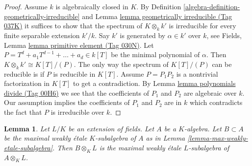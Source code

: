 \documentclass{amsart}
\theoremstyle{plain}
\newtheorem{lemma}[subsection]{Lemma}
\theoremstyle{definition}
\theoremstyle{remark}
\numberwithin{equation}{subsection}
\begin{document}
\begin{proof}
Assume $k$ is algebraically closed in $K$. By
Definition \ref{algebra-definition-geometrically-irreducible}
and Lemma \href{https://stacks.math.columbia.edu/tag/037K}{lemma geometrically irreducible (Tag 037K)} it suffices to show
that the spectrum of $K \otimes_k k'$ is irreducible for every
finite separable extension $k'/k$. Say $k'$ is generated by $\alpha \in k'$
over $k$, see
Fields, Lemma \href{https://stacks.math.columbia.edu/tag/030N}{lemma primitive element (Tag 030N)}. Let
$P = T^d + a_1 T^{d - 1} + \ldots + a_d \in k[T]$ be the minimal
polynomial of $\alpha$. Then $K \otimes_k k' \cong K[T]/(P)$.
The only way the spectrum of $K[T]/(P)$ can be reducible
is if $P$ is reducible in $K[T]$. Assume $P = P_1 P_2$ is a nontrivial
factorization in $K[T]$ to get a contradiction.
By Lemma \href{https://stacks.math.columbia.edu/tag/00H6}{lemma polynomials divide (Tag 00H6)} we see that
the coefficients of $P_1$ and $P_2$ are algebraic over $k$.
Our assumption implies the coefficients of $P_1$ and $P_2$
are in $k$ which contradicts the fact that $P$ is irreducible
over $k$.
\end{proof}


\begin{lemma}
\label{lemma-change-fields-max-weakly-etale-subalgebra}
Let $L/K$ be an extension of fields. Let $A$ be a $K$-algebra.
Let $B \subset A$ be the maximal weakly \'etale $K$-subalgebra of
$A$ as in Lemma \ref{lemma-max-weakly-etale-subalgebra}.
Then $B \otimes_K L$ is the maximal weakly \'etale $L$-subalgebra
of $A \otimes_K L$.
\end{lemma}
\end{document}
